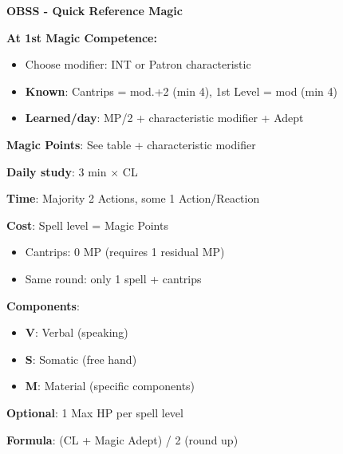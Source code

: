 \documentclass[10pt,a4paper,landscape]{article}
\begin{document}
	
	\begin{center}
		{\Huge\textbf{OBSS - Quick Reference Magic}}
	\end{center}
	
	\begin{multicols}{3}
		
		
		\begin{tcolorbox}[title=INITIAL SETUP]
			\textbf{At 1st Magic Competence:}
			\begin{itemize}[leftmargin=*,noitemsep]
				\item Choose modifier: INT or Patron characteristic
				\item \textbf{Known}: Cantrips = mod.+2 (min 4), 1st Level = mod (min 4)
				\item \textbf{Learned/day}:  MP/2 + characteristic modifier + Adept
			\end{itemize}
			
			\textbf{Magic Points}: See table + characteristic modifier
			
			\textbf{Daily study}: 3 min $\times$ CL
		\end{tcolorbox}
		
		\begin{tcolorbox}[title=CASTING SPELLS]
			\textbf{Time}: Majority 2 Actions, some 1 Action/Reaction
			
			\textbf{Cost}: Spell level = Magic Points
			\begin{itemize}[leftmargin=*,noitemsep]
				\item Cantrips: 0 MP (requires 1 residual MP)
				\item Same round: only 1 spell + cantrips
			\end{itemize}
			
			\textbf{Components}:
			\begin{itemize}[leftmargin=*,noitemsep]
				\item \textbf{V}: Verbal (speaking)
				\item \textbf{S}: Somatic (free hand)
				\item \textbf{M}: Material (specific components)
			\end{itemize}
			
			\textbf{Optional}: 1 Max HP per spell level
		\end{tcolorbox}
		
		\begin{tcolorbox}[title=MAXIMUM SPELL LEVEL]
			\textbf{Formula}: (CL + Magic Adept) / 2 (round up)
			

\end{tcolorbox}
\end{multicols}
\end{document}
